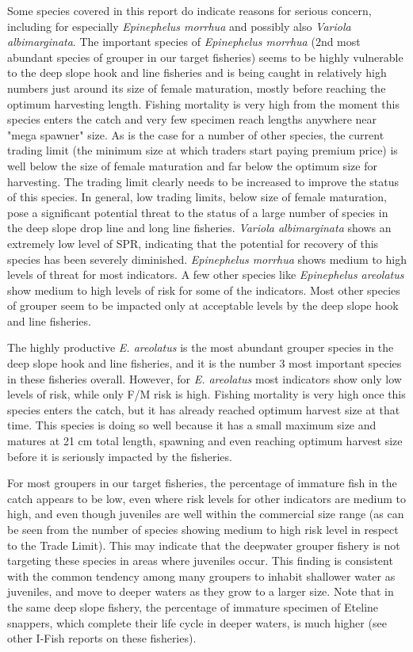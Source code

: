 Some species covered in this report do indicate reasons for serious concern, including for especially \textit{Epinephelus morrhua} and possibly also \textit{Variola albimarginata}. The important species of \textit{Epinephelus morrhua} (2nd most abundant species of grouper in our target fisheries) seems to be highly vulnerable to the deep slope hook and line fisheries and is being caught in relatively high numbers just around its size of female maturation, mostly before reaching the optimum harvesting length. Fishing mortality is very high from the moment this species enters the catch and very few specimen reach lengths anywhere near "mega spawner" size. As is the case for a number of other species, the current trading limit (the minimum size at which traders start paying premium price) is well below the size of female maturation and far below the optimum size for harvesting. The trading limit clearly needs to be increased to improve the status of this species. In general, low trading limits, below size of female maturation, pose a significant potential threat to the status of a large number of species in the deep slope drop line and long line fisheries.
\clearpage
\newpage
\textit{Variola albimarginata} shows an extremely low level of SPR, indicating that the potential for recovery of this species has been severely diminished. \textit{Epinephelus morrhua} shows medium to high levels of threat for most indicators. A few other species like \textit{Epinephelus areolatus} show medium to high levels of risk for some of the indicators. Most other species of grouper seem to be impacted only at acceptable levels by the deep slope hook and line fisheries.

The highly productive \textit{E. areolatus} is the most abundant grouper species in the deep slope hook and line fisheries, and it is the number 3 most important species in these fisheries overall. However, for \textit{E. areolatus} most indicators show only low levels of risk, while only F/M risk is high. Fishing mortality is very high once this species enters the catch, but it has already reached optimum harvest size at that time. This species is doing so well because it has a small maximum size and matures at 21 cm total length, spawning and even reaching optimum harvest size before it is seriously impacted by the fisheries.

For most groupers in our target fisheries, the percentage of immature fish in the catch appears to be low, even where risk levels for other indicators are medium to high, and even though juveniles are well within the commercial size range (as can be seen from the number of species showing medium to high risk level in respect to the Trade Limit). This may indicate that the deepwater grouper fishery is not targeting these species in areas where juveniles occur. This finding is consistent with the common tendency among many groupers to inhabit shallower water as juveniles, and move to deeper waters as they grow to a larger size. Note that in the same deep slope fishery, the percentage of immature specimen of Eteline snappers, which complete their life cycle in deeper waters, is much higher (see other I-Fish reports on these fisheries).

